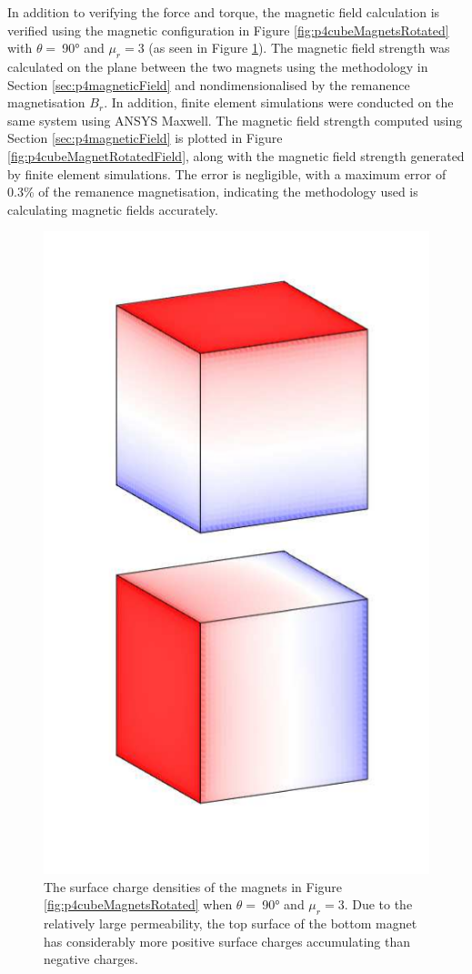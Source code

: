 In addition to verifying the force and torque, the magnetic field calculation is verified using the magnetic configuration in Figure \ref{fig:p4cubeMagnetsRotated} with \(\theta =\ \)\ang{90} and \(\mu_r = 3\) (as seen in Figure \ref{fig:p4cubeMagnetRotatedImage}). The magnetic field strength was calculated on the plane between the two magnets using the methodology in Section \ref{sec:p4magneticField} and nondimensionalised by the remanence magnetisation \(B_r\). In addition, finite element simulations were conducted on the same system using ANSYS Maxwell. The magnetic field strength computed using Section \ref{sec:p4magneticField} is plotted in Figure \ref{fig:p4cubeMagnetRotatedField}, along with the magnetic field strength generated by finite element simulations. The error is negligible, with a maximum error of 0.3\% of the remanence magnetisation, indicating the methodology used is calculating magnetic fields accurately.
\begin{figure}
	\centering
	\includegraphics[width=0.55\linewidth]{p4/p4FIG11}
	\caption{The surface charge densities of the magnets in Figure \ref{fig:p4cubeMagnetsRotated} when \(\theta =\ \)\ang{90} and \(\mu_r = 3\). Due to the relatively large permeability, the top surface of the bottom magnet has considerably more positive surface charges accumulating than negative charges.}
	\label{fig:p4cubeMagnetRotatedImage}
\end{figure}
